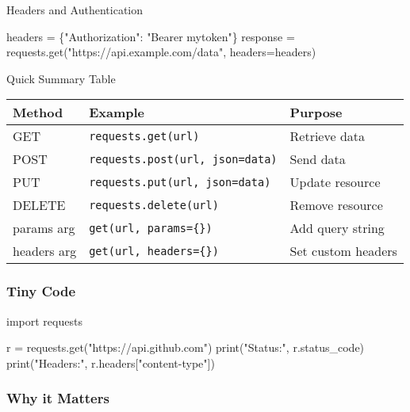 \documentclass[
  letterpaper,
  DIV=11,
  numbers=noendperiod]{scrreprt}
\newenvironment{Shaded}{\begin{snugshade}}{\end{snugshade}}
\newcommand{\BuiltInTok}[1]{\textcolor[rgb]{0.00,0.23,0.31}{#1}}
\newcommand{\ImportTok}[1]{\textcolor[rgb]{0.00,0.46,0.62}{#1}}
\newcommand{\NormalTok}[1]{\textcolor[rgb]{0.00,0.23,0.31}{#1}}
\newcommand{\OperatorTok}[1]{\textcolor[rgb]{0.37,0.37,0.37}{#1}}
\newcommand{\StringTok}[1]{\textcolor[rgb]{0.13,0.47,0.30}{#1}}
\begin{document}
Headers and Authentication

\begin{Shaded}
\begin{Highlighting}[]
\NormalTok{headers }\OperatorTok{=}\NormalTok{ \{}\StringTok{"Authorization"}\NormalTok{: }\StringTok{"Bearer mytoken"}\NormalTok{\}}
\NormalTok{response }\OperatorTok{=}\NormalTok{ requests.get(}\StringTok{"https://api.example.com/data"}\NormalTok{, headers}\OperatorTok{=}\NormalTok{headers)}
\end{Highlighting}
\end{Shaded}

Quick Summary Table

\begin{longtable}[]{@{}lll@{}}
\toprule\noalign{}
Method & Example & Purpose \\
\midrule\noalign{}
\endhead
\bottomrule\noalign{}
\endlastfoot
GET & \texttt{requests.get(url)} & Retrieve data \\
POST & \texttt{requests.post(url,\ json=data)} & Send data \\
PUT & \texttt{requests.put(url,\ json=data)} & Update resource \\
DELETE & \texttt{requests.delete(url)} & Remove resource \\
params arg & \texttt{get(url,\ params=\{\})} & Add query string \\
headers arg & \texttt{get(url,\ headers=\{\})} & Set custom headers \\
\end{longtable}

\subsubsection{Tiny Code}\label{tiny-code-97}

\begin{Shaded}
\begin{Highlighting}[]
\ImportTok{import}\NormalTok{ requests}

\NormalTok{r }\OperatorTok{=}\NormalTok{ requests.get(}\StringTok{"https://api.github.com"}\NormalTok{)}
\BuiltInTok{print}\NormalTok{(}\StringTok{"Status:"}\NormalTok{, r.status\_code)}
\BuiltInTok{print}\NormalTok{(}\StringTok{"Headers:"}\NormalTok{, r.headers[}\StringTok{"content{-}type"}\NormalTok{])}
\end{Highlighting}
\end{Shaded}

\subsubsection{Why it Matters}\label{why-it-matters-97}
\end{document}
